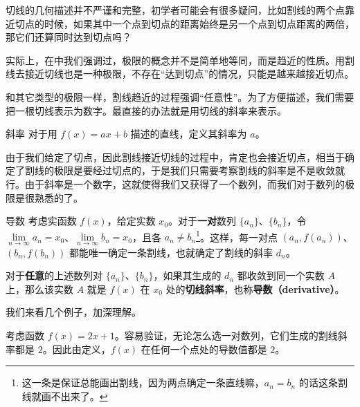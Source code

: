 



切线的几何描述并不严谨和完整，初学者可能会有很多疑问，比如割线的两个点靠近切点的时候，如果其中一个点到切点的距离始终是另一个点到切点距离的两倍，那它们还算同时达到切点吗？

实际上，在中我们强调过，极限的概念并不是简单地等同，而是趋近的性质。用割线去接近切线也是一种极限，不存在“达到切点”的情况，只能是越来越接近切点。

和其它类型的极限一样，割线趋近的过程强调“任意性”。为了方便描述，我们需要把一根切线表示为数字。最直接的办法就是用切线的斜率来表示。

\begin{definition}{斜率}
对于用 $f(x)=ax+b$ 描述的直线，定义其斜率为 $a$。
\end{definition}

由于我们给定了切点，因此割线接近切线的过程中，肯定也会接近切点，相当于确定了割线的极限是要经过切点的，于是我们只需要考察割线的斜率是不是收敛就行。由于斜率是一个数字，这就使得我们又获得了一个数列，而我们对于数列的极限是很熟悉的了。

\begin{definition}{导数}\label{def_Der2_1}
考虑实函数 $f(x)$，给定实数 $x_0$。对于\textbf{一对}数列 $\{a_n\}$、$\{b_n\}$，令 $\lim\limits_{n\to\infty}a_n=x_0$、$\lim\limits_{n\to\infty}b_n=x_0$，且各 $a_n\not=b_n$\footnote{这一条是保证总能画出割线，因为两点确定一条直线嘛，$a_n=b_n$ 的话这条割线就画不出来了。}。这样，每一对点 $(a_n, f(a_n))$、$ (b_n, f(b_n))$ 都能唯一确定一条割线，也就确定了割线的斜率 $d_n$。

对于\textbf{任意}的上述数列对 $\{a_n\}$、$\{b_n\}$，如果其生成的 $d_n$ 都收敛到同一个实数 $A$ 上，那么该实数 $A$ 就是 $f(x)$ 在 $x_0$ 处的\textbf{切线斜率}，也称\textbf{导数（derivative）}。
\end{definition}

我们来看几个例子，加深理解。

\begin{example}{}
考虑函数 $f(x)=2x+1$。容易验证，无论怎么选一对数列，它们生成的割线斜率都是 $2$。因此由定义，$f(x)$ 在任何一个点处的导数值都是 $2$。
\end{example}

